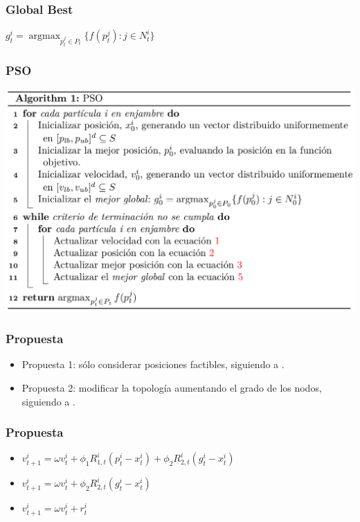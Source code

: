 \documentclass[10pt, compress]{beamer}
\DeclareMathOperator*{\argmax}{argmax}
\begin{document}
\begin{frame}[fragile]
  \frametitle{Global Best}
    \begin{center}
         $g_t^i = \argmax_{p_{t}^j \in P_t}  \{f(p_{t}^j): j \in N_t^i\}$
    \end{center}{}
\end{frame}

\begin{frame}[fragile]
  \frametitle{PSO}
    \begin{center}
    \includegraphics[scale=0.2]{pso.png}
    \end{center}
\end{frame}

\begin{frame}[fragile]
  \frametitle{Propuesta}
    \begin{center}
        \begin{itemize}
            \item Propuesta 1: sólo considerar posiciones factibles, siguiendo a \cite{xiahoui02}.
            \item Propuesta 2: modificar la topología aumentando el grado de los nodos, siguiendo a \cite{suganthan99}.
        \end{itemize}{}
    \end{center}{}
\end{frame}

\begin{frame}[fragile]
  \frametitle{Propuesta}
    \begin{center}
        \begin{itemize}
            \item $v_{t + 1}^i = \omega v_t^i + \phi_1 R_{1,t}^i(p_t^i- x_t^i) + \phi_2 R_{2,t}^i(g_t^i- x_t^i)$
            \item $v_{t + 1}^i = \omega v_t^i + \phi_2 R_{2,t}^i(g_t^i- x_t^i)$
        \item $v_{t + 1}^i = \omega v_t^i +  r_t^i$
        \end{itemize}{}
    \end{center}{}
\end{frame}
\end{document}
